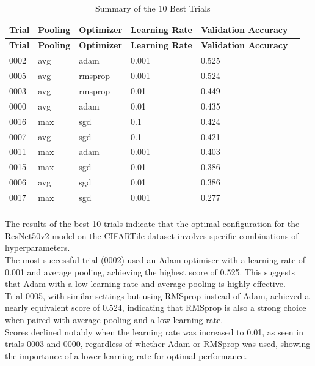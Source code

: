 \documentclass{article}
\begin{document}
\begin{longtable}{|l|l|l|l|l|l|}
    \hline
    \textbf{Trial} & \textbf{Pooling} & \textbf{Optimizer} & \textbf{Learning Rate} & \textbf{Validation Accuracy} \\ \hline
    \endfirsthead
    \hline
    \textbf{Trial} & \textbf{Pooling} & \textbf{Optimizer} & \textbf{Learning Rate} & \textbf{Validation Accuracy} \\ \hline
    \endhead
    0002 & avg & adam & 0.001 & 0.525 \\ \hline
    0005 & avg & rmsprop & 0.001 & 0.524 \\ \hline
    0003 & avg & rmsprop & 0.01 & 0.449 \\ \hline
    0000 & avg & adam & 0.01 & 0.435 \\ \hline
    0016 & max & sgd & 0.1 & 0.424 \\ \hline
    0007 & avg & sgd & 0.1 & 0.421 \\ \hline
    0011 & max & adam & 0.001 & 0.403 \\ \hline
    0015 & max & sgd & 0.01 & 0.386 \\ \hline
    0006 & avg & sgd & 0.01 & 0.386 \\ \hline
    0017 & max & sgd & 0.001 & 0.277 \\ \hline
    \caption{Summary of the 10 Best Trials}
    \label{tab:top_10_trials}
\end{longtable}

The results of the best 10 trials indicate that the optimal configuration
for the ResNet50v2 model on the CIFARTile dataset involves specific
combinations of hyperparameters.\\

The most successful trial (0002) used an Adam optimiser with a 
learning rate of 0.001 and average pooling, achieving the highest score 
of 0.525. This suggests that Adam with a low learning rate and average 
pooling is highly effective.\\

Trial 0005, with similar settings but using RMSprop 
instead of Adam, achieved a nearly equivalent score of 0.524,
indicating that RMSprop is also a strong choice when paired with
average pooling and a low learning rate.\\

Scores declined notably when the learning rate was increased to 0.01,
as seen in trials 0003 and 0000, regardless of whether Adam or RMSprop 
was used, showing the importance of a lower learning rate for optimal 
performance.\\
\end{document}

